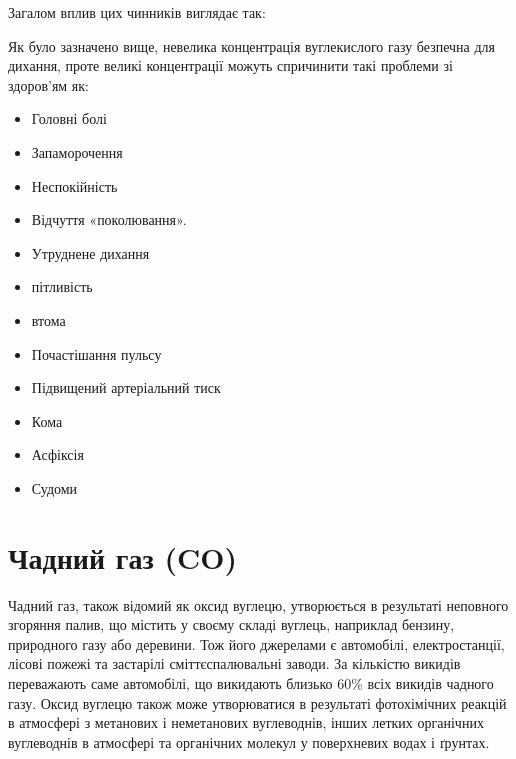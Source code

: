 Загалом вплив цих чинників виглядає так:



\begin{center}
\end{center}

\vspace{0.75cm}

Як було зазначено вище, невелика концентрація вуглекислого газу безпечна для дихання, проте великі концентрації можуть спричинити такі проблеми зі здоров'ям як: 


\begin{multicols}{2}
    \begin{itemize}
        \item Головні болі
        \item Запаморочення
        \item Неспокійність
        \item Відчуття «поколювання».
        \item Утруднене дихання
        \item пітливість
        \item втома
        \item Почастішання пульсу
        \item Підвищений артеріальний тиск
        \item Кома
        \item Асфіксія
        \item Судоми
    \end{itemize}
\end{multicols}
    
\section{Чадний газ (CO)}


Чадний газ, також відомий як оксид вуглецю, утворюється в результаті неповного згоряння палив, що містить у своєму складі вуглець, наприклад бензину, природного газу або деревини. 
Тож його джерелами є автомобілі, електростанції, лісові пожежі та застарілі сміттєспалювальні заводи.
За кількістю викидів переважають саме автомобілі, що викидають близько 60\% всіх викидів чадного газу.
Оксид вуглецю також може утворюватися в результаті фотохімічних реакцій в атмосфері з метанових і неметанових вуглеводнів, інших летких органічних вуглеводнів в атмосфері та органічних молекул у поверхневих водах і ґрунтах. 

